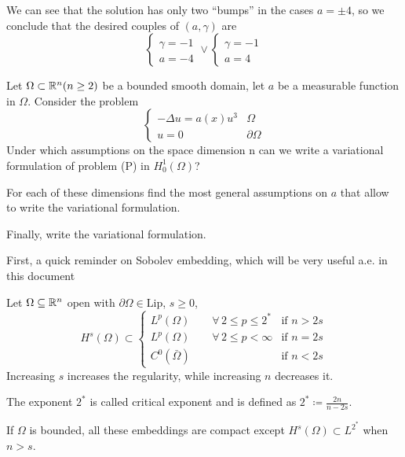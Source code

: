 We can see that the solution has only two ``bumps'' in the cases \(a = \pm 4\), so we conclude that the desired couples of \((a, \gamma)\) are 
\[
    \begin{cases}
        \gamma = -1\\
        a = -4
    \end{cases}
    \vee
    \begin{cases}
        \gamma = -1 \\ 
        a = 4
    \end{cases}
\]
\newpage
\begin{exercise}
Let \(\Omega \subset \mathbb{R}^n (n \geq 2)\) be a bounded smooth domain, let \(a\) be a measurable function in \(\Omega\).
Consider the problem
\[
    \begin{cases}
        - \Delta u = a(x) u^3 & \Omega \\
        u = 0 & \partial\Omega
    \end{cases}
    \tag*{(P)}
\]
Under which assumptions on the space dimension n can we write a variational formulation of problem (P) in
\(H^1_0(\Omega)\)? 

For each of these dimensions find the most general assumptions on \(a\) that allow to write the variational formulation. 

Finally, write the variational formulation.
\end{exercise}

First, a quick reminder on Sobolev embedding, which will be very useful a.e. in this document
\begin{remark}\label{sobolev_embedding}
    Let \(\Omega \subseteq \mathbb{R}^n\) open with \(\partial\Omega \in \text{Lip}\), \(s \geq 0\),
    \[
        H^s(\Omega) \subset 
        \begin{cases}
            L^p(\Omega) \qquad \forall \, 2 \leq p \leq 2^* & \text{if } n > 2s \\
            L^p(\Omega) \qquad \forall \, 2 \leq p < \infty & \text{if } n = 2s \\
            C^0(\bar{\Omega})  & \text{if } n < 2s
        \end{cases}
    \]
    Increasing \(s\) increases the regularity, while increasing \(n\) decreases it.

    The exponent \(2^*\) is called critical exponent and is defined as \(2^* \coloneqq \frac{2n}{n - 2s}\).

    If \(\Omega\) is bounded, all these embeddings are compact except \(H^s(\Omega) \subset L^{2^*}\) when \(n > s\).
\end{remark}

